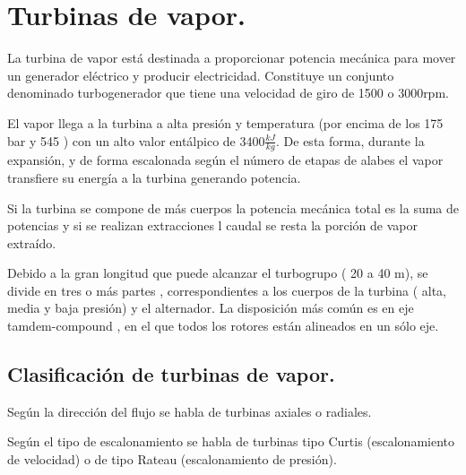 \section{Turbinas de vapor.}
La turbina de vapor está destinada a proporcionar potencia mecánica para
mover un generador eléctrico y producir electricidad. Constituye un conjunto denominado
turbogenerador que tiene una velocidad de giro de 1500 o 3000rpm.


El vapor llega a la turbina a alta presión y temperatura (por encima de los 175 bar y 545 \grado) con un alto valor entálpico de 3400$\frac{kJ}{kg}$. De esta forma, durante la expansión, y de forma escalonada según el número de etapas de alabes el vapor transfiere su energía a la turbina generando potencia. 





Si la turbina se compone de más cuerpos la potencia mecánica total es la suma de potencias y si se realizan extracciones l caudal se resta la porción de
vapor extraído.


Debido a la gran longitud que puede alcanzar el turbogrupo ( 20 a 40 m), se divide en tres o
más partes , correspondientes a los cuerpos de la turbina ( alta, media y baja presión) y el alternador. La disposición más común es en eje tamdem-compound , en el que todos los rotores están
alineados en un sólo eje.

\subsection{Clasificación de turbinas de vapor.}
Según la dirección del flujo se habla de turbinas axiales o radiales.


Según el tipo de escalonamiento se habla de turbinas tipo Curtis (escalonamiento de velocidad) o de tipo Rateau (escalonamiento de presión). 


